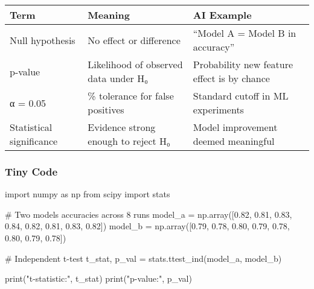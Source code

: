 \documentclass[
  letterpaper,
  DIV=11,
  numbers=noendperiod]{scrreprt}
\newenvironment{Shaded}{\begin{snugshade}}{\end{snugshade}}
\newcommand{\BuiltInTok}[1]{\textcolor[rgb]{0.00,0.23,0.31}{#1}}
\newcommand{\CommentTok}[1]{\textcolor[rgb]{0.37,0.37,0.37}{#1}}
\newcommand{\FloatTok}[1]{\textcolor[rgb]{0.68,0.00,0.00}{#1}}
\newcommand{\ImportTok}[1]{\textcolor[rgb]{0.00,0.46,0.62}{#1}}
\newcommand{\NormalTok}[1]{\textcolor[rgb]{0.00,0.23,0.31}{#1}}
\newcommand{\OperatorTok}[1]{\textcolor[rgb]{0.37,0.37,0.37}{#1}}
\newcommand{\StringTok}[1]{\textcolor[rgb]{0.13,0.47,0.30}{#1}}
\begin{document}
\begin{longtable}[]{@{}
  >{\raggedright\arraybackslash}p{}
  >{\raggedright\arraybackslash}p{}
  >{\raggedright\arraybackslash}p{}@{}}
\toprule\noalign{}
\begin{minipage}[b]{\linewidth}\raggedright
Term
\end{minipage} & \begin{minipage}[b]{\linewidth}\raggedright
Meaning
\end{minipage} & \begin{minipage}[b]{\linewidth}\raggedright
AI Example
\end{minipage} \\
\midrule\noalign{}
\endhead
\bottomrule\noalign{}
\endlastfoot
Null hypothesis & No effect or difference & ``Model A = Model B in
accuracy'' \\
p-value & Likelihood of observed data under H₀ & Probability new feature
effect is by chance \\
α = 0.05 & 5\% tolerance for false positives & Standard cutoff in ML
experiments \\
Statistical significance & Evidence strong enough to reject H₀ & Model
improvement deemed meaningful \\
\end{longtable}

\subsubsection{Tiny Code}\label{tiny-code-138}

\begin{Shaded}
\begin{Highlighting}[]
\ImportTok{import}\NormalTok{ numpy }\ImportTok{as}\NormalTok{ np}
\ImportTok{from}\NormalTok{ scipy }\ImportTok{import}\NormalTok{ stats}

\CommentTok{\# Two models\textquotesingle{} accuracies across 8 runs}
\NormalTok{model\_a }\OperatorTok{=}\NormalTok{ np.array([}\FloatTok{0.82}\NormalTok{, }\FloatTok{0.81}\NormalTok{, }\FloatTok{0.83}\NormalTok{, }\FloatTok{0.84}\NormalTok{, }\FloatTok{0.82}\NormalTok{, }\FloatTok{0.81}\NormalTok{, }\FloatTok{0.83}\NormalTok{, }\FloatTok{0.82}\NormalTok{])}
\NormalTok{model\_b }\OperatorTok{=}\NormalTok{ np.array([}\FloatTok{0.79}\NormalTok{, }\FloatTok{0.78}\NormalTok{, }\FloatTok{0.80}\NormalTok{, }\FloatTok{0.79}\NormalTok{, }\FloatTok{0.78}\NormalTok{, }\FloatTok{0.80}\NormalTok{, }\FloatTok{0.79}\NormalTok{, }\FloatTok{0.78}\NormalTok{])}

\CommentTok{\# Independent t{-}test}
\NormalTok{t\_stat, p\_val }\OperatorTok{=}\NormalTok{ stats.ttest\_ind(model\_a, model\_b)}

\BuiltInTok{print}\NormalTok{(}\StringTok{"t{-}statistic:"}\NormalTok{, t\_stat)}
\BuiltInTok{print}\NormalTok{(}\StringTok{"p{-}value:"}\NormalTok{, p\_val)}
\end{Highlighting}
\end{Shaded}
\end{document}
